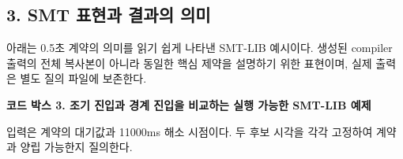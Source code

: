 \documentclass[11pt,a4paper]{article}
\begin{document}
\subsection*{3. SMT 표현과 결과의 의미}

아래는 0.5초 계약의 의미를 읽기 쉽게 나타낸 SMT-LIB 예시이다. 생성된 compiler 출력의 전체 복사본이 아니라 동일한 핵심 제약을 설명하기 위한 표현이며, 실제 출력은 별도 질의 파일에 보존한다.\par

\par\medskip\noindent\begin{minipage}{\linewidth}
\textbf{코드 박스 3. 조기 진입과 경계 진입을 비교하는 실행 가능한 SMT-LIB 예제}\par

입력은 계약의 대기값과 11000ms 해소 시점이다. 두 후보 시각을 각각 고정하여 계약과 양립 가능한지 질의한다.\par


\end{minipage}
\end{document}
